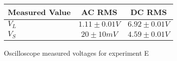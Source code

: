 \begin{figure}[H]    \centering    \begin{tabular}{|l|c|c|}
        \hline
        Measured Value & AC RMS & DC RMS \\
        \hline
        $V_{L}$ & $1.11\pm 0.01\unit{V}$ & $6.92\pm 0.01\unit{V}$ \\
        $V_{S}$ & $20\pm 10\unit{mV}$ & $4.59\pm 0.01\unit{V}$ \\
        \hline
    \end{tabular}    \caption{Oscilloscope measured voltages for experiment E}\end{figure}